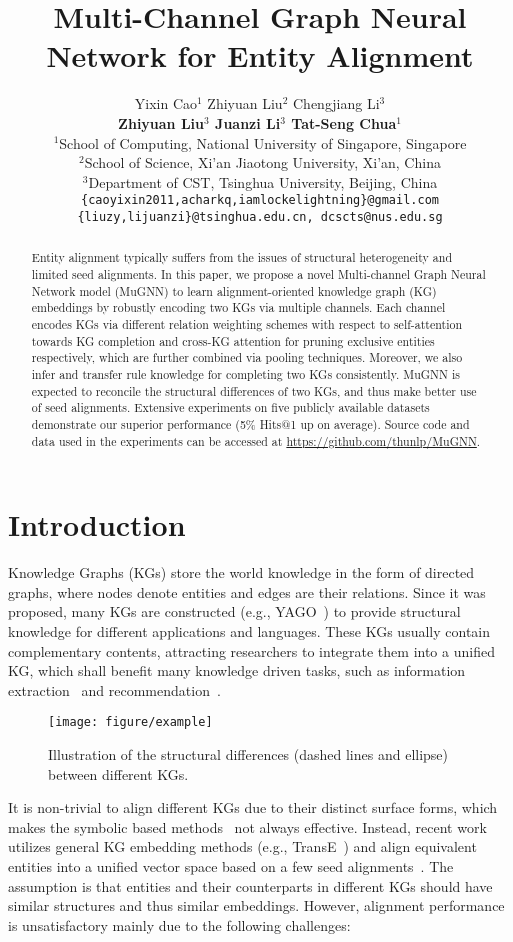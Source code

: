 \documentclass[11pt,a4paper]{article}
\title{Multi-Channel Graph Neural Network for Entity Alignment}
\author{Yixin Cao$^1$ \quad Zhiyuan Liu$^2$ \quad Chengjiang Li$^3$\\
\textbf{Zhiyuan Liu$^3$ \quad Juanzi Li$^3$ \quad Tat-Seng Chua$^1$}\\
$^1$School of Computing, National University of Singapore, Singapore\\
$^2$School of Science, Xi'an Jiaotong University, Xi'an, China\\
$^3$Department of CST, Tsinghua University, Beijing, China\\
{\tt \{caoyixin2011,acharkq,iamlockelightning\}@gmail.com} \\
{\tt \{liuzy,lijuanzi\}@tsinghua.edu.cn, dcscts@nus.edu.sg} \\
}
\date{}
\begin{document}
\maketitle
\begin{abstract}
  Entity alignment typically suffers from the issues of structural heterogeneity and limited seed alignments. In this paper, we propose a novel Multi-channel Graph Neural Network model (MuGNN) to learn alignment-oriented knowledge graph (KG) embeddings by robustly encoding two KGs via multiple channels. Each channel encodes KGs via different relation weighting schemes with respect to self-attention towards KG completion and cross-KG attention for pruning exclusive entities respectively, which are further combined via pooling techniques. Moreover, we also infer and transfer rule knowledge for completing two KGs consistently. MuGNN is expected to reconcile the structural differences of two KGs, and thus make better use of seed alignments. Extensive experiments on five publicly available datasets demonstrate our superior performance (5\% Hits@1 up on average). Source code and data used in the experiments can be accessed at \url{https://github.com/thunlp/MuGNN}.
\end{abstract}

\section{Introduction}
\label{sec:intro}
Knowledge Graphs (KGs) store the world knowledge in the form of directed graphs, where nodes denote entities and edges are their relations. Since it was proposed, many KGs are constructed (e.g., YAGO~\cite{rebele2016yago}) to provide structural knowledge for different applications and languages. These KGs usually contain complementary contents, attracting researchers to integrate them into a unified KG, which shall benefit many knowledge driven tasks, such as information extraction~\cite{cao2018neural} and recommendation~\cite{wang2018explainable}.

\begin{figure}[htb]
	\centerline{\texttt{[image: figure/example]}}
	\caption{Illustration of the structural differences (dashed lines and ellipse) between different KGs.}
	\label{fig:example}
\end{figure}

It is non-trivial to align different KGs due to their distinct surface forms, which makes the symbolic based methods~\cite{suchanek2011paris} not always effective. Instead, recent work utilizes general KG embedding methods (e.g., TransE~\cite{bordes2013translating}) and align equivalent entities into a unified vector space based on a few seed alignments~\cite{chen2016multilingual,sun2017cross,zhu2017iterative,chen2018co,sun2018bootstrapping,wang2018cross}. The assumption is that entities and their counterparts in different KGs should have similar structures and thus similar embeddings. However, alignment performance is unsatisfactory mainly due to the following challenges:
\end{document}
